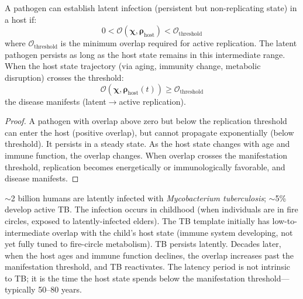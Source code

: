 \documentclass[11pt,twocolumn,a4paper]{article}
\newcommand{\Template}{\boldsymbol{\chi}}
\newcommand{\State}{\boldsymbol{\rho}}
\newcommand{\Overlap}{\mathcal{O}}
\begin{document}
\begin{theorem}
\label{thm:latency}
A pathogen can establish latent infection (persistent but non-replicating state) in a host if:
\begin{equation}
0 < \Overlap(\Template, \State_{\mathrm{host}}) < \Overlap_{\mathrm{threshold}}
\label{eq:latency_condition}
\end{equation}
where $\Overlap_{\mathrm{threshold}}$ is the minimum overlap required for active replication. The latent pathogen persists as long as the host state remains in this intermediate range. When the host state trajectory (via aging, immunity change, metabolic disruption) crosses the threshold:
\begin{equation}
\Overlap(\Template, \State_{\mathrm{host}}(t)) \ge \Overlap_{\mathrm{threshold}}
\label{eq:reactivation_condition}
\end{equation}
the disease manifests (latent$\to$active replication).
\end{theorem}

\begin{proof}
A pathogen with overlap above zero but below the replication threshold can enter the host (positive overlap), but cannot propagate exponentially (below threshold). It persists in a steady state. As the host state changes with age and immune function, the overlap changes. When overlap crosses the manifestation threshold, replication becomes energetically or immunologically favorable, and disease manifests.
\end{proof}

\begin{example}
$\sim$2 billion humans are latently infected with \textit{Mycobacterium tuberculosis}; $\sim$5\% develop active TB. The infection occurs in childhood (when individuals are in fire circles, exposed to latently-infected elders). The TB template initially has low-to-intermediate overlap with the child's host state (immune system developing, not yet fully tuned to fire-circle metabolism). TB persists latently. Decades later, when the host ages and immune function declines, the overlap increases past the manifestation threshold, and TB reactivates. The latency period is not intrinsic to TB; it is the time the host state spends below the manifestation threshold—typically 50--80 years.
\end{example}
\end{document}
